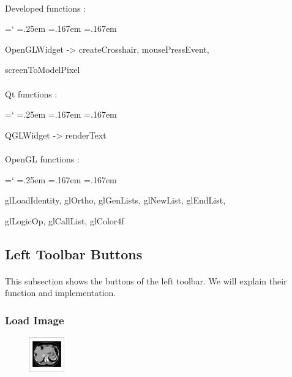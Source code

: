 \documentclass[12pt]{report}
\DeclareRobustCommand*{\ttfamily}{
  \origttfamily
  \hyphenchar\font=`\-\relax
  \fontdimen3\font=.25em\relax
  \fontdimen4\font=.167em\relax
  \fontdimen7\font=.167em\relax
}
\newenvironment{code}{\ttfamily}{}
\begin{document}
\paragraph{}
	Developed functions :

	\begin{code}
	OpenGLWidget -> createCrosshair, mousePressEvent,

	screenToModelPixel
	\end{code}

\paragraph{}
	Qt functions :

	\begin{code}
	QGLWidget -> renderText
	\end{code}

\paragraph{}
	OpenGL functions :

	\begin{code}
	glLoadIdentity, glOrtho,  glGenLists, glNewList, glEndList,
	
	glLogicOp, glCallList, glColor4f
	\end{code}





\subsection{Left Toolbar Buttons} \label{subsec:left toolbar}
\paragraph{}
This subsection shows the buttons of the left toolbar. We will explain their function and implementation.

\subsubsection{Load Image}

\begin{figure}
\vspace{-20pt}
\includegraphics[width=1.5cm]{icons/picture.jpg}
\end{figure}
\end{document}
